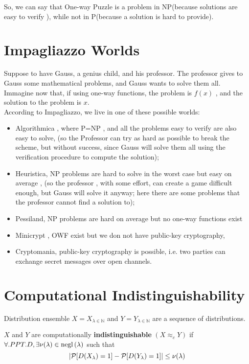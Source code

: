 So, we can say that One-way Puzzle is a problem in
NP(because solutions are easy to verify ), while not in P(because a solution is
hard to provide).\\

\section {  Impagliazzo Worlds}
Suppose to have Gauss, a genius child, and his professor. The professor gives to
Gauss some mathematical problems, and Gauss wants to solve them all.\\
Immagine now that, if using one-way functions, the problem is $f(x)$ , and the
solution to the problem is $x$.\\
According to Impagliazzo, we live in one of these possible worlds:
\begin{itemize}
    \item Algorithmica , where P=NP , and all the problems easy to verify
        are also easy to solve, (so the Professor can try as hard as possible to
        break the scheme, but without success, since Gauss will solve them all
        using the verification procedure to compute the solution);
    \item Heuristica, NP problems are hard to solve in the worst case but
        easy on average , (so the professor , with some effort, can create a
        game difficult enough, but Gauss will solve it anyway; here there are
        some problems that the professor cannot find a solution to);
    \item Pessiland, NP problems are hard on average but no one-way
        functions exist
    \item Minicrypt , OWF exist but we don not have public-key cryptography,
    \item Cryptomania, public-key cryptography is possible,  i.e. two
        parties can exchange secret messages over open channels.
\end{itemize}
    
\section{Computational Indistinguishability}
Distribution ensemble $X={X_{\lambda \in \mathbb{N}}}$ and $Y={Y_{\lambda \in
\mathbb{N} }}$  are a sequence of distributions.

\begin{definition}
    $X$ and $Y$ are computationally \textbf{indistinguishable} $(X
    \approx_{c} Y)$ if $ \forall. PPT. D, \exists \nu(\lambda) \in
    \negl{\lambda} $ such that
    \begin{equation}
    |   \P [ D(X_{\lambda})=1 ] - \P [ D(Y_{\lambda})=1 ]   | \le \nu(\lambda) 
    \end{equation}
\end{definition}



